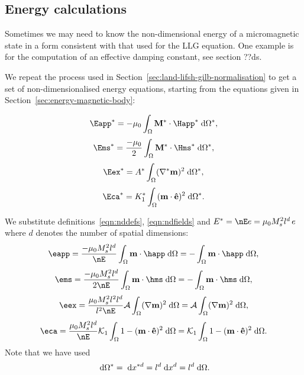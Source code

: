\subsection{Energy calculations}
\label{sec:energy-calculations}

Sometimes we may need to know the non-dimensional energy of a micromagnetic state in a form consistent with that used for the LLG equation. One example is for the computation of an effective damping constant, see section ??ds.

We repeat the process used in Section~\ref{sec:land-lifsh-gilb-normalisation} to get a set of non-dimensionalised energy equations, starting from the equations given in Section~\ref{sec:energy-magnetic-body}:

\begin{equation*}
  \Eapp^* = - \mu_0 \int_{\magd} \Mv^* \cdot \Happ^* \d \magd^*,
\end{equation*}
\begin{equation}
  \Ems^* =  \frac{-\mu_0}{2} \int_{\magd} \Mv^* \cdot \Hms^* \d \magd^*,
\end{equation}
\begin{equation*}
  \Eex^* =  \Exchc^* \int_{\magd} (\nabla^* \mv)^2 \d \magd^*,
\end{equation*}
\begin{equation*}
  \Eca^* =  \Kone^* \int_\magd (\mv \cdot \ev)^2 \d \magd^*.
\end{equation*}

We substitute definitions~\eqref{eqn:nddefs}, \eqref{eqn:ndfields} and $E^* = \nE e = \mu_0 M_s^2 l^d \, e$ where $d$ denotes the number of spatial dimensions:
\begin{equation*}
  \eapp = \frac{-\mu_0 M_s^2 l^d}{\nE} \int_{\magd} \mv \cdot \happ \d \magd
  = - \int_{\magd} \mv \cdot \happ \d \magd,
\end{equation*}
\begin{equation}
  \ems = \frac{-\mu_0 M_s^2 l^d}{2\nE} \int_{\magd} \mv \cdot \hms \d \magd
  = - \int_{\magd} \mv \cdot \hms \d \magd,
\end{equation}
\begin{equation*}
  \eex =  \frac{\mu_0 M_s^2 l^2 l^d}{l^2\nE} \exchc \int_{\magd} (\nabla \mv)^2 \d \magd
  = \exchc \int_{\magd} (\nabla \mv)^2 \d \magd,
\end{equation*}
\begin{equation*}
  \eca = \frac{\mu_0 M_s^2 l^d}{\nE} \kone \int_\magd 1 - (\mv \cdot \ev)^2 \d \magd
  = \kone \int_\magd 1 - (\mv \cdot \ev)^2 \d \magd.
\end{equation*}
Note that we have used
\begin{equation}
  {\; \text{d}} \Omega^* = {\; \text{d}} x^{*d} = l^d {\; \text{d}} x^d = l^d {\; \text{d}} \Omega.
\end{equation}



